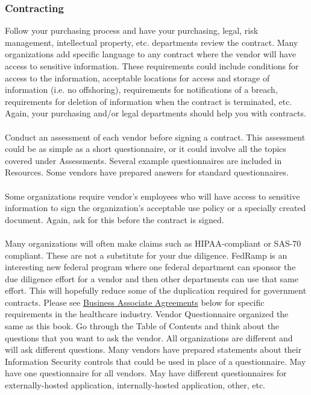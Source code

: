 \subsubsection{Contracting}
Follow your purchasing process and have your purchasing, legal, risk management, intellectual property, etc. departments review the contract. Many organizations add specific language to any contract where the vendor will have access to sensitive information. These requirements could include conditions for access to the information, acceptable locations for access and storage of information (i.e. no offshoring), requirements for notifications of a breach, requirements for deletion of information when the contract is terminated, etc. Again, your purchasing and/or legal departments should help you with contracts.\\\\
Conduct an assessment of each vendor before signing a contract. This assessment could be as simple as a short questionnaire, or it could involve all the topics covered under Assessments. Several example questionnaires are included in Resources. Some vendors have prepared answers for standard questionnaires.\\\\
Some organizations require vendor's employees who will have access to sensitive information to sign the organization's acceptable use policy or a specially created document. Again, ask for this before the contract is signed.\\\\
Many organizations will often make claims such as HIPAA-compliant or SAS-70 compliant. These are not a substitute for your due diligence. FedRamp is an interesting new federal program where one federal department can sponsor the due diligence effort for a vendor and then other departments can use that same effort. This will hopefully reduce some of the duplication required for government contracts.
Please see \hyperref[subsubsec:"Business Associate Agreements"]{Business Associate Agreements} below for specific requirements in the healthcare industry.
Vendor Questionnaire organized the same as this book. Go through the Table of Contents and think about the questions that you want to ask the vendor. All organizations are different and will ask different questions. Many vendors have prepared statements about their Information Security controls that could be used in place of a questionnaire. May have one questionnaire for all vendors. May have different questionnaires for externally-hosted application, internally-hosted application, other, etc.
